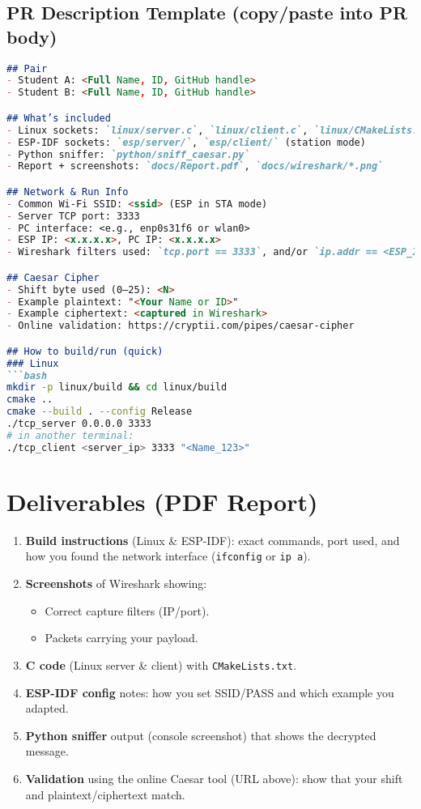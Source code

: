 \documentclass[11pt]{article}
\begin{document}
\subsection*{PR Description Template (copy/paste into PR body)}
\begin{lstlisting}[language=Markdown]
## Pair
- Student A: <Full Name, ID, GitHub handle>
- Student B: <Full Name, ID, GitHub handle>

## What’s included
- Linux sockets: `linux/server.c`, `linux/client.c`, `linux/CMakeLists.txt`
- ESP-IDF sockets: `esp/server/`, `esp/client/` (station mode)
- Python sniffer: `python/sniff_caesar.py`
- Report + screenshots: `docs/Report.pdf`, `docs/wireshark/*.png`

## Network & Run Info
- Common Wi-Fi SSID: <ssid> (ESP in STA mode)
- Server TCP port: 3333
- PC interface: <e.g., enp0s31f6 or wlan0>
- ESP IP: <x.x.x.x>, PC IP: <x.x.x.x>
- Wireshark filters used: `tcp.port == 3333`, and/or `ip.addr == <ESP_IP>`

## Caesar Cipher
- Shift byte used (0–25): <N>
- Example plaintext: "<Your Name or ID>"
- Example ciphertext: <captured in Wireshark>
- Online validation: https://cryptii.com/pipes/caesar-cipher

## How to build/run (quick)
### Linux
```bash
mkdir -p linux/build && cd linux/build
cmake ..
cmake --build . --config Release
./tcp_server 0.0.0.0 3333
# in another terminal:
./tcp_client <server_ip> 3333 "<Name_123>"
\end{lstlisting}


\section*{Deliverables (PDF Report)}
\begin{enumerate}
  \item \textbf{Build instructions} (Linux \& ESP-IDF): exact commands, port used, and how you found the network interface (\texttt{ifconfig} or \texttt{ip a}).
  \item \textbf{Screenshots} of Wireshark showing:
  \begin{itemize}
    \item Correct capture filters (IP/port).
    \item Packets carrying your payload.
  \end{itemize}
  \item \textbf{C code} (Linux server \& client) with \texttt{CMakeLists.txt}.
  \item \textbf{ESP-IDF config} notes: how you set SSID/PASS and which example you adapted.
  \item \textbf{Python sniffer} output (console screenshot) that shows the decrypted message.
  \item \textbf{Validation} using the online Caesar tool (URL above): show that your shift and plaintext/ciphertext match.
\end{enumerate}
\end{document}
